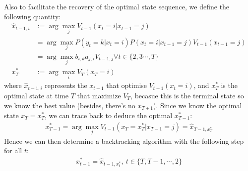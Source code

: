 \documentclass{article} [10pt] %
\begin{document}
Also to facilitate the recovery of the optimal state sequence, we define the following quantity:
\begin{align*}
	\hat x_{t-1, i} &:= \arg\max_j V_{t-1}(x_t=i|x_{t-1}=j) \\
	&=\arg\max_{j}P(y_t=k|x_t=i)P(x_{t}=i|x_{t-1}=j)V_{t-1}(x_{t-1}=j) \\
	&=\arg\max_j b_{i, k}a_{j, i}V_{t-1, j} \forall t\in\{2,3\cdots,T\} \\
	x_{T}^* &:= \arg\max_i V_T(x_T=i)
\end{align*}
where $\hat x_{t-1, i}$ represents the $x_{t-1}$ that optimise $V_{t-1}(x_t=i)$, and $x^*_T$ is the optimal state at time $T$ that maximize $V_T$, becasue this is the terminal state so we know the best value (besides, there's no $x_{T+1}$). 
Since we know the optimal state $x_T=x_T^*$, we can trace back to deduce the optimal $x_{T-1}^*$:
\begin{align*}
	x_{T-1}^* = \arg\max_j V_{t-1}(x_T=x_T^*|x_{T-1}=j) = \hat x_{T-1, x_T^*}
\end{align*}
Hence we can then determine a backtracking algorithm with the following step for all $t$:
\begin{align*}
	x^*_{t-1} = \hat x_{t-1, x^*_t},\ t \in \{T, T-1, \cdots, 2\}
\end{align*}
\end{document}
